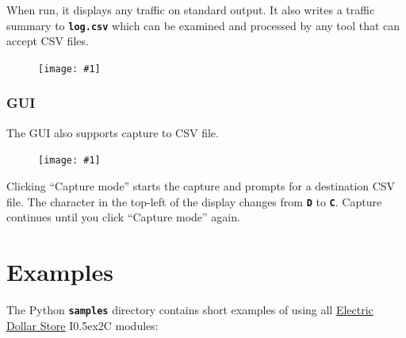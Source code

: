 \documentclass{article}
\newcommand{\two}{\raise0.5ex\hbox{\footnotesize{2}}}
\newcommand{\iic}{I\two{}C}
\newcommand{\png}[1]{
\begin{figure}[H]
\begin{center}
\texttt{[image: \#1]}
\end{center}
\end{figure}
}
\newcommand{\mach}[1]{\texttt{\textbf{#1}}}
\newcommand{\gap}{\vspace{10pt}}
\begin{document}
When run, it displays any traffic on standard output.
It also writes a traffic summary to \mach{log.csv} which
can be examined and processed by any tool that can accept CSV files.

\png{img/i2cdriver/csv}

\subsubsection{GUI}

The GUI also supports capture to CSV file.

\png{img/i2cdriver/win32-gui-capture}

Clicking ``Capture mode'' starts the capture
and prompts for a destination CSV file.
The character in the top-left of the display changes from \mach{D} to \mach{C}.
Capture continues until you click ``Capture mode'' again.

\newpage
\section{Examples}

The Python \mach{samples} directory contains short examples of using all
\href{https://electricdollarstore.com}{Electric Dollar Store} \iic{} modules:\gap
\end{document}

